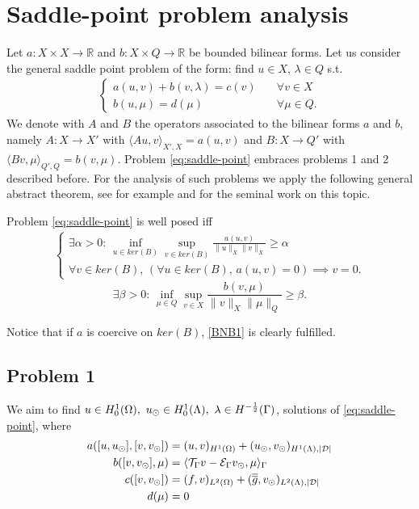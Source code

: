 \section{Saddle-point problem analysis}
Let $a: X \times X \rightarrow \mathbb{R}$ and $b: X\times Q \rightarrow \mathbb{R}$ be bounded bilinear forms. Let us consider the general saddle point problem of the form: find $u\in X$, $\lambda\in Q$ s.t.
\begin{eqnarray}\label{eq:saddle-point}
\begin{cases}
a(u,v)+b(v,\lambda)=c(v)\quad &\forall v\in X\\
b(u,\mu)=d(\mu) \quad &\forall \mu\in Q.
\end{cases}
\end{eqnarray}
We denote with $A$ and $B$ the operators associated to the bilinear forms $a$ and $b$, 
namely $A: X \longrightarrow X'$ with $\langle Au,v\rangle _{X',X} = a(u,v)$ and $B: X \longrightarrow Q'$ with $\langle Bv,\mu\rangle_{Q',Q} = b(v,\mu)$. Problem \eqref{eq:saddle-point} embraces problems 1 and 2 described before. 
For the analysis of such problems we apply the following general abstract theorem,
see for example \cite[Theorem 2.34]{MR2050138} and \cite{MR365287} for the seminal work on this topic.
\begin{theorem}{}\label{th:bnb}
Problem \eqref{eq:saddle-point} is well posed iff 
\begin{eqnarray}\label{BNB1}
\begin{cases}
\exists \alpha >0 :\, \inf_{u\in ker(B)}\sup_{v\in ker(B)} \frac{a(u,v)}{\|u\|_{X}\|v\|_{X}}\geq \alpha\\
\forall v \in ker(B), \, \left( \forall u \in ker(B),\, a(u,v)=0 \right)\implies v=0.
\end{cases}
\end{eqnarray}
\begin{equation}\label{eq:infsup}
\exists \beta >0:\,\inf_{\mu\in Q}\sup_{v\in X} \frac{b(v,\mu)}{\|v\|_{X}\|\mu\|_{Q}}\geq \beta .
\end{equation}
\end{theorem} 
Notice that if $a$ is coercive on $ker(B)$, \eqref{BNB1} is clearly fulfilled. \\

\subsection{Problem 1}
We aim to find $u \in H^1_0(\Omega),\ u_{\odot} \in H_0^1(\Lambda), \ \lambda \in H^{-\frac12}(\Gamma )$,
solutions of \eqref{eq:saddle-point}, where
\begin{align*}
a([u, u_{\odot}], [v, v_{\odot}])&= (u,v)_{H^1(\Omega)} + (u_{\odot},v_{\odot})_{H^1(\Lambda),|\mathcal{D}|}
\\
b([v, v_{\odot}], \mu)&= \langle {\mathcal{T}_\Gamma} v - \mathcal{E}_\Gamma v_{\odot} , \mu \rangle_\Gamma
\\
c([v,v_{\odot}])&= (f,v)_{L^2(\Omega)} + (\overline{\overline{g}},v_{\odot})_{L^2(\Lambda),|\mathcal{D}|}
\\
d(\mu)&=0
\end{align*}

